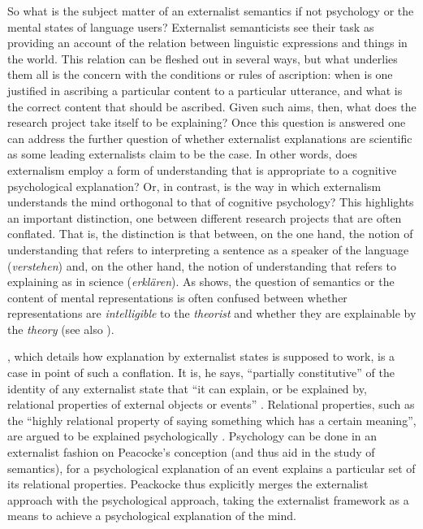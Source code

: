 So what is the subject matter of an externalist semantics if not psychology or the mental states of language users? Externalist semanticists see their task as providing an account of the relation between linguistic expressions and things in the world. This relation can be fleshed out in several ways, but what underlies them all is the concern with the conditions or rules of ascription: when is one justified in ascribing a particular content to a particular utterance, and what is the correct content that should be ascribed. Given such aims, then, what does the research project take itself to be explaining? Once this question is answered one can address the further question of whether externalist explanations are scientific as some leading externalists claim to be the case. In other words, does externalism employ a form of understanding that is appropriate to a cognitive psychological explanation? Or, in contrast, is the way in which externalism understands the mind orthogonal to that of cognitive psychology? This highlights an important distinction, one between different research projects that are often conflated. That is, the distinction is that between, on the one hand, the notion of understanding that refers to interpreting a sentence as a speaker of the language (\textit{verstehen}) and, on the other hand, the notion of understanding that refers to explaining as in science (\textit{erklären}). As \citet{Slezak2004} shows, the question of semantics or the content of mental representations is often confused between whether representations are \textit{intelligible} to the \textit{theorist} and whether they are explainable by the \textit{theory} (see also \citealt{Slezak1990,Slezak2018}). 

\citet{Peacocke1993}, which details how explanation by externalist states is supposed to work, is a case in point of such a conflation. It is, he says, “partially constitutive” of the identity of any externalist state that “it can explain, or be explained by, relational properties of external objects or events” \citep[206]{Peacocke1993}. Relational properties, such as the “highly relational property of saying something which has a certain meaning”, are argued to be explained psychologically \citep[204]{Peacocke1993}. Psychology can be done in an externalist fashion on Peacocke’s conception (and thus aid in the study of semantics), for a psychological explanation of an event explains a particular set of its relational properties. Peackocke thus explicitly merges the externalist approach with the psychological approach, taking the externalist framework as a means to achieve a psychological explanation of the mind.

